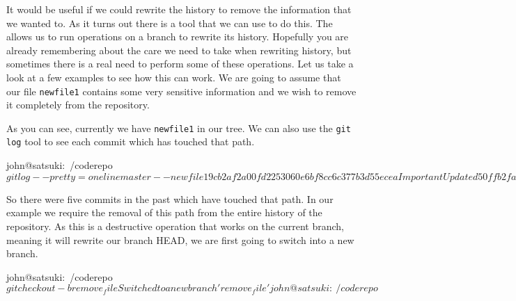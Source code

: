It would be useful if we could rewrite the history to remove the information that we wanted to.
As it turns out there is a tool that we can use to do this.
The  allows us to run operations on a branch to rewrite its history.
Hopefully you are already remembering about the care we need to take when rewriting history, but sometimes there is a real need to perform some of these operations.
Let us take a look at a few examples to see how this can work.
We are going to assume that our file \texttt{newfile1} contains some very sensitive information and we wish to remove it completely from the repository.


As you can see, currently we have \texttt{newfile1} in our tree.
We can also use the \texttt{git log} tool to see each commit which has touched that path.

\begin{code}
john@satsuki:~/coderepo$ git log --pretty=oneline master -- newfile1
9cb2af2a00fd2253060e6bf8cc6c377b3d55ecea Important Update
d50ffb2fa536d869f2c4e89e8d6a48e0a29c5cc1 Merged in zaney
a27d49ef11d9f0e66edbad8f6c7806510ad5b2be Made an awesome change
cfbecabb031696a217b77b0e1285f2d5fc2ea2a3 Fantastic new feature
55fb69f4ad26fdb6b90ac6f43431be40779962dd Added two new files
john@satsuki:~/coderepo$
\end{code}

So there were five commits in the past which have touched that path.
In our example we require the removal of this path from the entire history of the repository.
As this is a destructive operation that works on the current branch, meaning it will rewrite our branch HEAD, we are first going to switch into a new branch.

\begin{code}
john@satsuki:~/coderepo$ git checkout -b remove_file
Switched to a new branch 'remove_file'
john@satsuki:~/coderepo$ 
\end{code}

